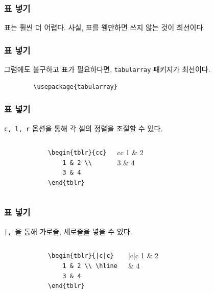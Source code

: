 \begin{frame}
    \frametitle{표 넣기}

    표는 훨씬 더 어렵다. 사실, 표를 웬만하면 쓰지 않는 것이 최선이다.

\end{frame}

\begin{frame}[fragile]
    \frametitle{표 넣기}

    그럼에도 불구하고 표가 필요하다면, \texttt{tabularray} 패키지가 최선이다.

    \begin{verbatim}
        \usepackage{tabularray}
    \end{verbatim}

\end{frame}

\begin{frame}[fragile]
    \frametitle{표 넣기}

    \texttt{c, l, r} 옵션을 통해 각 셀의 정렬을 조절할 수 있다.

    \begin{columns}[c]
        \begin{verbatim}
            \begin{tblr}{cc}
                1 & 2 \\
                3 & 4
            \end{tblr}
        \end{verbatim}

        \begin{tblr}{cc}
            1 & 2 \\
            3 & 4
        \end{tblr}
    \end{columns}

\end{frame}

\begin{frame}[fragile]
    \frametitle{표 넣기}

    \texttt{|, \hline}을 통해 가로줄, 세로줄을 넣을 수 있다.

    \begin{columns}[c]
        \begin{verbatim}
            \begin{tblr}{|c|c}
                1 & 2 \\ \hline
                3 & 4
            \end{tblr}
        \end{verbatim}

        \begin{tblr}{|c|c}
            1 & 2 \\  & 4
        \end{tblr}
    \end{columns}

\end{frame}

